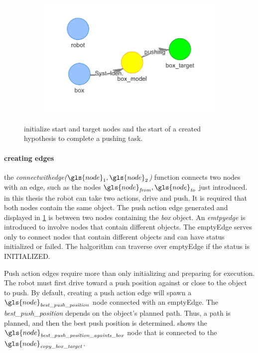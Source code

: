 \begin{figure}[h]
\begin{subfigure}{.3\textwidth}
    \caption{}\label{subfig:robot_push_2}
    \end{subfigure}
    \begin{subfigure}{.3\textwidth}
    \includegraphics[width=1.1\textwidth]{figures/proposed_method/connecting_nodes/robot_push/robot_push_2}
    \caption{}\label{subfig:robot_push_3}
    \end{subfigure}
    \caption{initialize start and target nodes and the start of a created hypothesis to complete a pushing task.}%
    \label{fig:robot_push_1}
\end{figure}

\paragraph{creating edges}
the \textit{connectwithedge($\gls{node}_1, \gls{node}_2$)} function connects two nodes with an edge, such as the nodes $\gls{node}_\mathit{from}, \gls{node}_\mathit{to}$ just introduced. in this thesis the robot can take two actions, drive and push. It is required that both nodes contain the same object. The push action edge generated and displayed in \cref{subfig:robot_push_2} is between two nodes containing the \textit{box} object. An \textit{emtpyedge} is introduced to involve nodes that contain different objects. The emptyEdge serves only to connect nodes that contain different objects and can have status initialized or failed. The \ac{halgorithm} can traverse over emptyEdge if the status is INITIALIZED.\bs


Push action edges require more than only initializing and preparing for execution. The robot must first drive toward a push position against or close to the object to push. By default, creating a push action edge will spawn a $\gls{node}_\mathit{best\_push\_position}$ node connected with an emptyEdge. The \textit{best\_push\_position} depends on the object's planned path. Thus, a path is planned, and then the best push position is determined.  shows the $\gls{node}_\mathit{best\_push\_position\_againts\_box}$ node that is connected to the $\gls{node}_\mathit{copy\_box\_target}$. 

